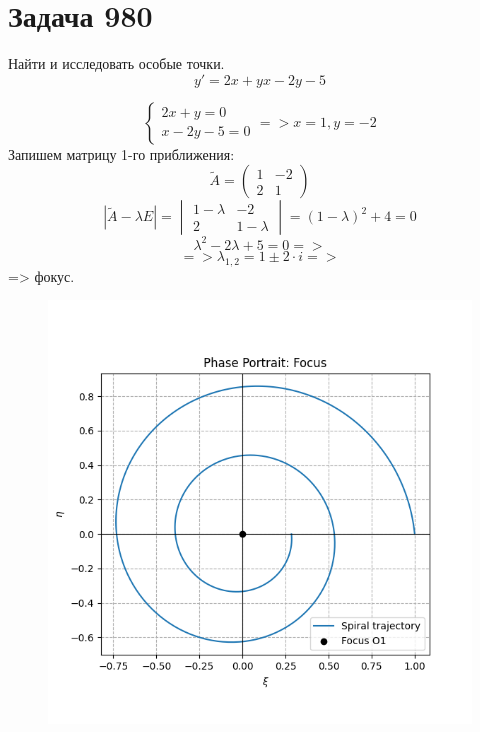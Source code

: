 \section*{Задача 980}
Найти и исследовать особые точки.
$$
    y' = {2x + y}{x - 2y - 5}
$$

\begin{solution}
    $$\begin{cases}
            2x + y = 0 \\
            x - 2y - 5 = 0
        \end{cases} => x = 1, y = -2 $$
    Запишем матрицу 1-го приближения:
    $$ \tilde{A} = \begin{pmatrix}
            1 & -2 \\
            2 & 1
        \end{pmatrix} $$
    $$ |\tilde{A} - \lambda E| = \begin{vmatrix}
            1 - \lambda & -2          \\
            2           & 1 - \lambda
        \end{vmatrix} = (1 - \lambda)^2 + 4 = 0 $$
    $$ \lambda^2 - 2\lambda + 5 = 0 => $$
    $$ => \lambda_{1, 2} = 1 \pm 2 \cdot i => $$
    => фокус.
    \begin{figure}[h]
        \centering
        \includegraphics[width=0.8\linewidth]{graph/980.png}
    \end{figure}
\end{solution}